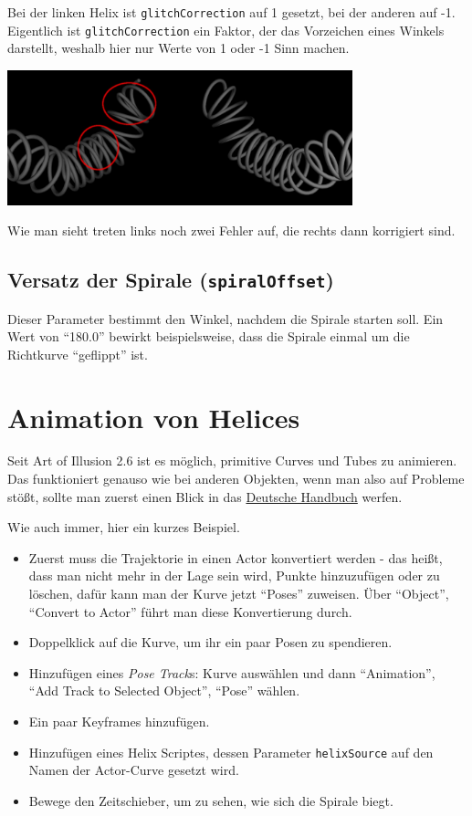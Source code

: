 \documentclass[12pt,a4paper]{scrartcl}
\begin{document}
Bei der linken Helix ist \texttt{glitchCorrection} auf 1 gesetzt, bei der
anderen auf -1. Eigentlich ist \texttt{glitchCorrection} ein Faktor, der das
Vorzeichen eines Winkels darstellt, weshalb hier nur Werte von 1 oder -1 Sinn
machen.
\begin{center}
	\includegraphics[width=0.75\textwidth]{../pics/glitchCorr-edit.jpg}
\end{center}

Wie man sieht treten links noch zwei Fehler auf, die rechts dann korrigiert
sind.

\subsection{Versatz der Spirale (\texttt{spiralOffset})}
Dieser Parameter bestimmt den Winkel, nachdem die Spirale starten soll. Ein
Wert von ``180.0'' bewirkt beispielsweise, dass die Spirale einmal um die
Richtkurve ``geflippt'' ist.

\section{Animation von Helices}
Seit Art of Illusion 2.6 ist es möglich, primitive Curves und Tubes zu animieren.
Das funktioniert genauso wie bei anderen Objekten, wenn man also auf Probleme
stößt, sollte man zuerst einen Blick in das
\href{http://www.uninformativ.de/tutorials/Vidiot/AoI_Manual_2_5_ger.zip}{Deutsche Handbuch}
werfen.

Wie auch immer, hier ein kurzes Beispiel.
\begin{itemize}
	\item Zuerst muss die Trajektorie in einen Actor konvertiert werden -
		das heißt, dass man nicht mehr in der Lage sein wird, Punkte
		hinzuzufügen oder zu löschen, dafür kann man der Kurve jetzt ``Poses''
		zuweisen. Über ``Object'', ``Convert to Actor'' führt man diese
		Konvertierung durch.
	\item Doppelklick auf die Kurve, um ihr ein paar Posen zu spendieren.
	\item Hinzufügen eines \emph{Pose Track}s: Kurve auswählen und dann
		``Animation'', ``Add Track to Selected Object'', ``Pose'' wählen.
	\item Ein paar Keyframes hinzufügen.
	\item Hinzufügen eines Helix Scriptes, dessen Parameter \texttt{helixSource}
		auf den Namen der Actor-Curve gesetzt wird.
	\item Bewege den Zeitschieber, um zu sehen, wie sich die Spirale biegt.
\end{itemize}
\end{document}
